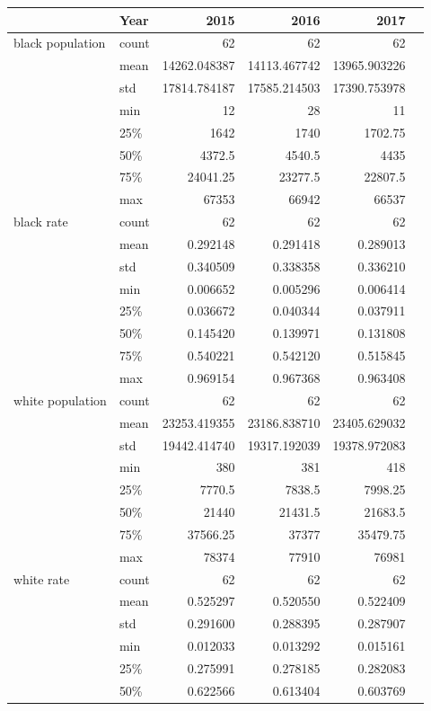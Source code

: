 \documentclass{article}
\begin{document}
\begin{tabular}{llrrrr}
\toprule          & Year &         2015 &         2016 &         2017 & \\
\midrule

black population & count &      62 &      62 &      62 \\           & mean &   14262.048387 &   14113.467742 &   13965.903226 \\           & std &   17814.784187 &   17585.214503 &   17390.753978 \\           & min &      12 &      28 &      11 \\           & 25\% &    1642 &    1740 &    1702.75 \\           & 50\% &    4372.5 &    4540.5 &    4435 \\           & 75\% &   24041.25 &   23277.5 &   22807.5 \\           & max &   67353 &   66942 &   66537 \\black rate & count &      62 &      62 &      62 \\           & mean &       0.292148 &       0.291418 &       0.289013 \\           & std &       0.340509 &       0.338358 &       0.336210 \\           & min &       0.006652 &       0.005296 &       0.006414 \\           & 25\% &       0.036672 &       0.040344 &       0.037911 \\           & 50\% &       0.145420 &       0.139971 &       0.131808 \\           & 75\% &       0.540221 &       0.542120 &       0.515845 \\           & max &       0.969154 &       0.967368 &       0.963408 \\white population & count &      62 &      62 &      62 \\           & mean &   23253.419355 &   23186.838710 &   23405.629032 \\           & std &   19442.414740 &   19317.192039 &   19378.972083 \\           & min &     380 &     381 &     418 \\           & 25\% &    7770.5 &    7838.5 &    7998.25 \\           & 50\% &   21440 &   21431.5 &   21683.5 \\           & 75\% &   37566.25 &   37377 &   35479.75 \\           & max &   78374 &   77910 &   76981 \\white rate & count &      62 &      62 &      62 \\           & mean &       0.525297 &       0.520550 &       0.522409 \\           & std &       0.291600 &       0.288395 &       0.287907 \\           & min &       0.012033 &       0.013292 &       0.015161 \\           & 25\% &       0.275991 &       0.278185 &       0.282083 \\           & 50\% &       0.622566 &       0.613404 &       0.603769 \\           
\end{tabular}
\end{document}
